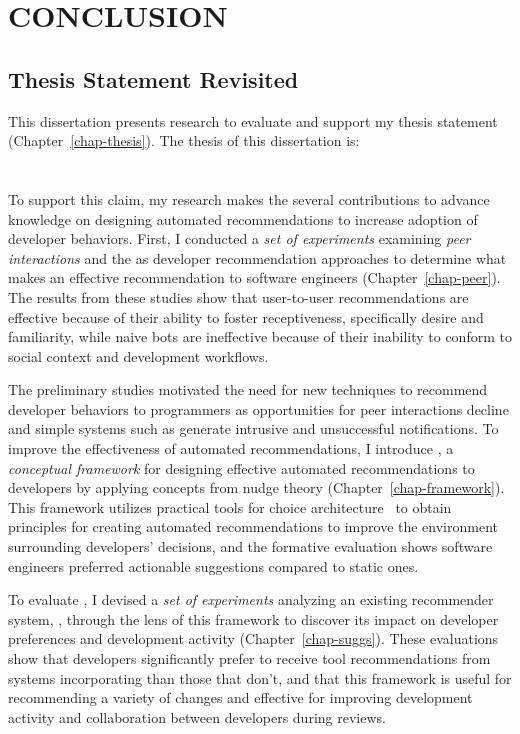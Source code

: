 \chapter{CONCLUSION}
\label{chap-end}


\section{Thesis Statement Revisited}

This dissertation presents research to evaluate and support my thesis statement (Chapter~\ref{chap-thesis}). The thesis of this dissertation is: \\

\thesis \\ \\

To support this claim, my research makes the several contributions to advance knowledge on designing automated recommendations to increase adoption of developer behaviors. First, I conducted a \textit{set of experiments} examining \textit{peer interactions} and the \tele as developer recommendation approaches to determine what makes an effective recommendation to software engineers (Chapter~\ref{chap-peer}). The results from these studies show that user-to-user recommendations are effective because of their ability to foster receptiveness, specifically desire and familiarity, while naive bots are ineffective because of their inability to conform to social context and development workflows.

The preliminary studies motivated the need for new techniques to recommend developer behaviors to programmers as opportunities for peer interactions decline and simple systems such as \toolone generate intrusive and unsuccessful notifications. To improve the effectiveness of automated recommendations, I introduce \framework, a \textit{conceptual framework} for designing effective automated recommendations to developers by applying concepts from nudge theory (Chapter~\ref{chap-framework}). This framework utilizes practical tools for choice architecture~\cite{johnson2012beyond} to obtain principles for creating automated recommendations to improve the environment surrounding developers' decisions, and the formative evaluation shows software engineers preferred actionable suggestions compared to static ones. 

To evaluate \framework, I devised a \textit{set of experiments} analyzing an existing recommender system, \suggs, through the lens of this framework to discover its impact on developer preferences and development activity (Chapter~\ref{chap-suggs}). These evaluations show that developers significantly prefer to receive tool recommendations from systems incorporating \framework than those that don't, and that this framework is useful for recommending a variety of changes and effective for improving development activity and collaboration between developers during reviews. 

